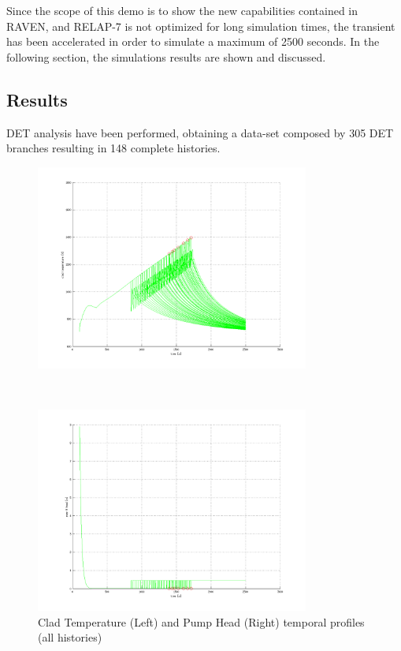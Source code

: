 Since the scope of this demo is to show the new capabilities contained in RAVEN, and RELAP-7 is not optimized for long simulation times, the transient has been accelerated in order to simulate a maximum of 2500 seconds. 
In the following section, the simulations results are shown and discussed.
\subsection{Results} 
DET analysis have been performed, obtaining a data-set composed by 305 DET branches resulting in 148 complete histories.

\begin{figure}
 \begin{minipage}[b]{8.5cm}
   \centering
   \includegraphics[width=9cm]{figures/CladTemperature.png}
 \end{minipage}
 \ \hspace{2mm} \hspace{3mm} \
 \begin{minipage}[b]{8.5cm}
   \centering
   \includegraphics[width=9cm]{figures/HeadPump.png}
 \end{minipage}
\caption{Clad Temperature (Left) and Pump Head (Right) temporal profiles (all histories)}
\label{fig:ESBPall}
\end{figure}
\vspace{-5mm}

